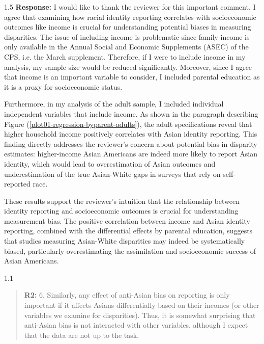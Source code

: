 \documentclass[12pt,english]{article}
\newcommand{\rrquote}{1.1}
\newcommand{\rrxspc}{1.5}
\begin{document}
\begin{refsection}
        \begin{spacing}{\rrxspc}
            \textbf{Response:} I would like to thank the reviewer for this important comment. I agree that examining how racial identity reporting correlates with socioeconomic outcomes like income is crucial for understanding potential biases in measuring disparities. The issue of including income is problematic since family income is only available in the Annual Social and Economic Supplements (ASEC) of the CPS, i.e. the March supplement. Therefore, if I were to include income in my analysis, my sample size would be reduced significantly. Moreover, since I agree that income is an important variable to consider, I included parental education as it is a proxy for socioeconomic status. 

            Furthermore, in my analysis of the adult sample, I included individual independent variables that include income. As shown in the paragraph describing Figure (\ref{plot01-regression-byparent-adults}), the adult specifications reveal that higher household income positively correlates with Asian identity reporting. This finding directly addresses the reviewer's concern about potential bias in disparity estimates: higher-income Asian Americans are indeed more likely to report Asian identity, which would lead to overestimation of Asian outcomes and underestimation of the true Asian-White gaps in surveys that rely on self-reported race.

            These results support the reviewer's intuition that the relationship between identity reporting and socioeconomic outcomes is crucial for understanding measurement bias. The positive correlation between income and Asian identity reporting, combined with the differential effects by parental education, suggests that studies measuring Asian-White disparities may indeed be systematically biased, particularly overestimating the assimilation and socioeconomic success of Asian Americans.
    \end{spacing}

    \begin{spacing}{\rrquote}
        \begin{quotation}
        \textbf{R2: } 6. Similarly, any effect of anti-Asian bias on reporting is only important if it affects Asians differentially based on their incomes (or other variables we examine for disparities). Thus, it is somewhat surprising that anti-Asian bias is not interacted with other variables, although I expect that the data are not up to the task.
        \end{quotation}
        \end{spacing}
        

\end{refsection}
\end{document}
